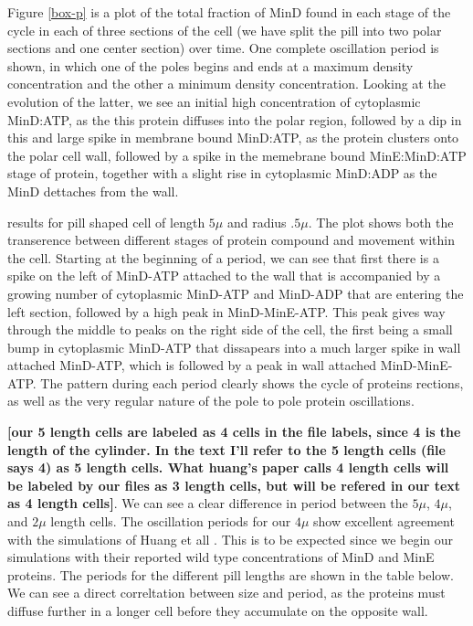 \documentclass[letterpaper,twocolumn,amsmath,amssymb,pre]{revtex4-1}
\newcommand{\red}[1]{{\bf \color{red} #1}}
\newcommand{\fixme}[1]{\red{[#1]}}
\begin{document}
Figure \ref{box-p} is a plot of the total fraction of
MinD found in each stage of the cycle in each of three sections of the
cell (we have split the pill into two polar sections and one center
section) over time.  One complete oscillation period is shown, in
which one of the poles begins and ends at a maximum density
concentration and the other a minimum density concentration.  Looking
at the evolution of the latter, we see an initial high concentration
of cytoplasmic MinD:ATP, as the this protein diffuses into the polar
region, followed by a dip in this and large spike in membrane bound
MinD:ATP, as the protein clusters onto the polar cell wall, followed
by a spike in the memebrane bound MinE:MinD:ATP stage of protein,
together with a slight rise in cytoplasmic MinD:ADP as the MinD
dettaches from the wall.

results for pill shaped cell of length
$5\mu$ and radius $.5\mu$.  The plot shows both the transerence
between different stages of protein compound and movement within the
cell.  Starting at the beginning of a period, we can see that first
there is a spike on the left of MinD-ATP attached to the wall that is
accompanied by a growing number of cytoplasmic MinD-ATP and MinD-ADP
that are entering the left section, followed by a high peak in
MinD-MinE-ATP.  This peak gives way through the middle to peaks on the
right side of the cell, the first being a small bump in cytoplasmic
MinD-ATP that dissapears into a much larger spike in wall attached
MinD-ATP, which is followed by a peak in wall attached MinD-MinE-ATP.
The pattern during each period clearly shows the cycle of proteins
rections, as well as the very regular nature of the pole to pole
protein oscillations.

\fixme{our 5 length cells are labeled as 4 cells in the file labels,
  since 4 is the length of the cylinder. In the text I'll refer to the
  5 length cells (file says 4) as 5 length cells.  What huang's paper
  calls 4 length cells will be labeled by our files as 3 length cells,
  but will be refered in our text as 4 length cells}.  We can see a
clear difference in period between the $5\mu$, $4\mu$, and $2\mu$
length cells.  The oscillation periods for our $4\mu$ show excellent
agreement with the simulations of Huang et all
\cite{huang2003dynamic}.  This is to be expected since we begin our
simulations with their reported wild type concentrations of MinD and
MinE proteins. The periods for the different pill lengths are shown in
the table below.  We can see a direct correltation between size and
period, as the proteins must diffuse further in a longer cell before
they accumulate on the opposite wall.
\end{document}
